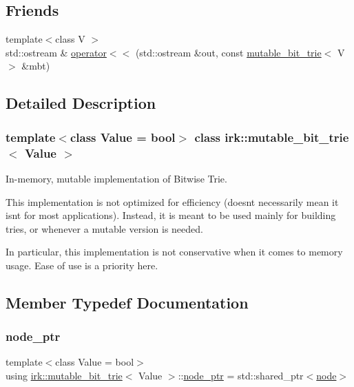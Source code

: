 \subsection*{Friends}
\begin{DoxyCompactItemize}
\item 
{\footnotesize template$<$class V $>$ }\\std\+::ostream \& \mbox{\hyperlink{classirk_1_1mutable__bit__trie_a91e672d5695fe80b17bbfd474d593ec2}{operator$<$$<$}} (std\+::ostream \&out, const \mbox{\hyperlink{classirk_1_1mutable__bit__trie}{mutable\+\_\+bit\+\_\+trie}}$<$ V $>$ \&mbt)
\end{DoxyCompactItemize}


\subsection{Detailed Description}
\subsubsection*{template$<$class Value = bool$>$\newline
class irk\+::mutable\+\_\+bit\+\_\+trie$<$ Value $>$}

In-\/memory, mutable implementation of Bitwise Trie. 

This implementation is not optimized for efficiency (doesn\textquotesingle{}t necessarily mean it isn\textquotesingle{}t for most applications). Instead, it is meant to be used mainly for building tries, or whenever a mutable version is needed.

In particular, this implementation is not conservative when it comes to memory usage. Ease of use is a priority here. 

\subsection{Member Typedef Documentation}
\mbox{\label{classirk_1_1mutable__bit__trie_abd23179ac4f02a981d4f47b4c0652287}} 
\subsubsection{\texorpdfstring{node\+\_\+ptr}{node\_ptr}}
{\footnotesize\ttfamily template$<$class Value = bool$>$ \\
using \mbox{\hyperlink{classirk_1_1mutable__bit__trie}{irk\+::mutable\+\_\+bit\+\_\+trie}}$<$ Value $>$\+::\mbox{\hyperlink{classirk_1_1mutable__bit__trie_abd23179ac4f02a981d4f47b4c0652287}{node\+\_\+ptr}} =  std\+::shared\+\_\+ptr$<$\mbox{\hyperlink{structirk_1_1mutable__bit__trie_1_1node}{node}}$>$}


